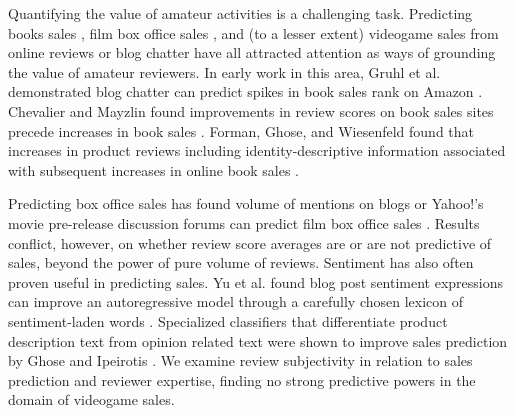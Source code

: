 \documentclass{sig-alternate}
\begin{document}
Quantifying the value of amateur activities is a challenging task. 
Predicting books sales \cite{gruhl2005predictive, chevalier2003effect}, film box office sales \cite{dellarocas2007exploring, yu2012mining}, and (to a lesser extent) videogame sales \cite{ehrenfeld2011predicting, marcoux2009hybrid} from online reviews or blog chatter have all attracted attention as ways of grounding the value of amateur reviewers. In early work in this area, Gruhl et al. demonstrated blog chatter can predict spikes in book sales rank on Amazon \cite{gruhl2005predictive}. Chevalier and Mayzlin found improvements in review scores on book sales sites precede increases in book sales \cite{chevalier2003effect}. Forman, Ghose, and Wiesenfeld found that increases in product reviews including identity-descriptive information associated with subsequent increases in online book sales \cite{ghose2007designing}.

Predicting box office sales has found volume of mentions on blogs or Yahoo!'s movie pre-release discussion forums can predict film box office sales \cite{liu2001word, duan2008online}. Results conflict, however, on whether review score averages are \cite{dellarocas2007exploring, hennig-thurau2012movie-reanalysis} or are not \cite{liu2001word, duan2008online} predictive of sales, beyond the power of pure volume of reviews.
Sentiment has also often proven useful in predicting sales. 
Yu et al. found blog post sentiment expressions can improve an autoregressive model through a carefully chosen lexicon of sentiment-laden words \cite{yu2012mining}. 
Specialized classifiers that differentiate product description text from opinion related text were shown to improve sales prediction by Ghose and Ipeirotis \cite{ghose2007designing}. 
We examine review subjectivity in relation to sales prediction and reviewer expertise, finding no strong predictive powers in the domain of videogame sales.
\end{document}

